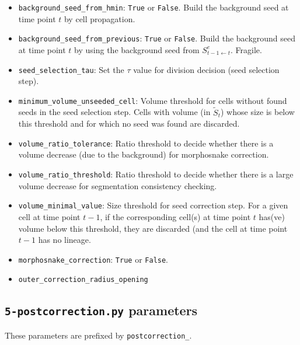 \begin{itemize}
\item \texttt{background\_seed\_from\_hmin}:
  \texttt{True} or \texttt{False}. 
  Build the background seed at time point $t$ by cell propagation.  
\item \texttt{background\_seed\_from\_previous}:
  \texttt{True} or \texttt{False}.
  Build the background seed at time point $t$ by using the background 
  seed from $S^e_{t-1 \leftarrow t}$. 
  Fragile. 
  
\item \texttt{seed\_selection\_tau}:
  Set the $\tau$ value for division decision (seed selection step).
 
\item \texttt{minimum\_volume\_unseeded\_cell}:
  Volume threshold for cells without found seeds in the seed 
  selection step. Cells with volume (in $\tilde{S}_t$) whose size is below
  this threshold and for which no seed was found are discarded.

\item \texttt{volume\_ratio\_tolerance}:
  Ratio threshold to decide whether there is a volume decrease 
  (due to the background) for morphosnake correction.
\item \texttt{volume\_ratio\_threshold}:
  Ratio threshold to decide whether there is a large volume decrease
  for segmentation consistency checking.
\item \texttt{volume\_minimal\_value}:
  Size threshold for seed correction step. For a given cell at time 
  point $t-1$, if the corresponding cell(s) at time point $t$ has(ve) 
  volume below this threshold, they are discarded (and the cell at time 
  point $t-1$ has no lineage.
  
\item \texttt{morphosnake\_correction}:
  \texttt{True} or \texttt{False}. 
\item \texttt{outer\_correction\_radius\_opening}
\end{itemize}










\subsection{\texttt{5-postcorrection.py} parameters}
\label{sec:cli:parameters:postcorrection}

These parameters are prefixed by \texttt{postcorrection\_}.

